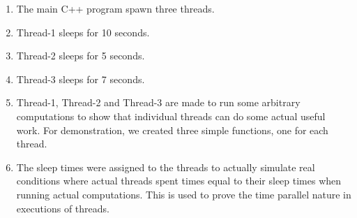 \begin{enumerate}
	
	\item The main C++ program spawn three threads.
	
	\item Thread-1 sleeps for 10 seconds.
	\item Thread-2 sleeps for  5 seconds.
	\item Thread-3 sleeps for  7 seconds.
	
	\item Thread-1, Thread-2 and Thread-3 are made to run some arbitrary computations to show that individual threads can do some actual useful work. For demonstration, we created three simple functions, one for each thread.  
	
	\item The sleep times were assigned to the threads to actually simulate real conditions where actual threads spent times equal to their sleep times when running actual computations. This is used to prove the time parallel nature in executions of threads.   
	
\end{enumerate}



